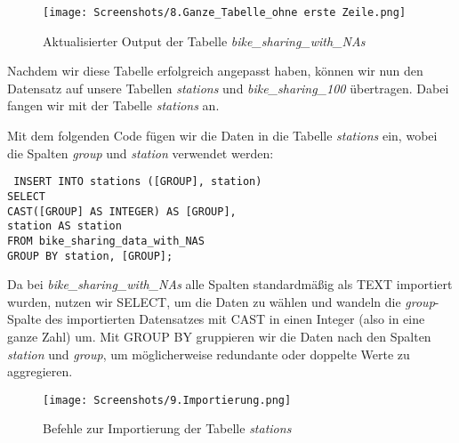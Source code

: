 \documentclass[a4paper, 12pt]{article}
\begin{document}
\vspace{\baselineskip}

\begin{figure}[ht]
    \centering
    \texttt{[image: Screenshots/8.Ganze\_Tabelle\_ohne erste Zeile.png]}
    \par Aktualisierter Output der Tabelle \textit{bike\_sharing\_with\_NAs}
\end{figure}

\vspace{\baselineskip}


{\fontsize{12}{15}\selectfont
Nachdem wir diese Tabelle erfolgreich angepasst haben, können wir nun den Datensatz auf unsere Tabellen \textit{stations} und \textit{bike\_sharing\_100} übertragen. Dabei fangen wir mit der Tabelle \textit{stations} an.

Mit dem folgenden Code fügen wir die Daten in die Tabelle \textit{stations} ein, wobei die Spalten \textit{group} und \textit{station} verwendet werden:

\vspace{\baselineskip}

{\fontsize{10}{12}\selectfont
\texttt{%
INSERT INTO stations ([GROUP], station) \\
SELECT \\
    \hspace*{1.5em} CAST([GROUP] AS INTEGER) AS [GROUP], \\
    \hspace*{1.5em} station AS station \\
FROM bike\_sharing\_data\_with\_NAS \\
GROUP BY station, [GROUP];
}}

\vspace{\baselineskip}

Da bei \textit{bike\_sharing\_with\_NAs} alle Spalten standardmäßig als TEXT importiert wurden, nutzen wir SELECT, um die Daten zu wählen und wandeln die \textit{group}-Spalte des importierten Datensatzes mit CAST in einen Integer (also in eine ganze Zahl) um.
Mit GROUP BY gruppieren wir die Daten nach den Spalten \textit{station} und \textit{group}, um möglicherweise redundante oder doppelte Werte zu aggregieren.}

\vspace{\baselineskip}

\begin{figure}[ht]
    \centering
    \texttt{[image: Screenshots/9.Importierung.png]}
    \par  Befehle zur Importierung der Tabelle \textit{stations}
\end{figure}
\end{document}
